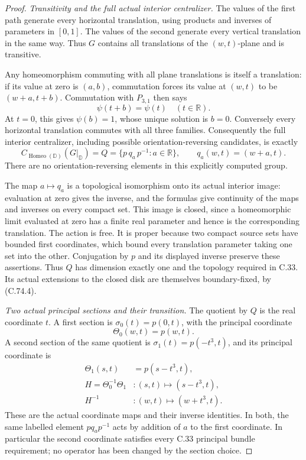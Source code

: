 \begin{proof}
\emph{Transitivity and the full actual interior centralizer.}
The values of the first path generate every
horizontal translation, using products and
inverses of parameters in $[0,1]$.
The values of the second generate every
vertical translation in the same way.
Thus $G$ contains all translations of the
$(w,t)$-plane and is transitive.

Any homeomorphism commuting with all plane
translations is itself a translation:
if its value at zero is $(a,b)$, commutation
forces its value at $(w,t)$ to be
$(w+a,t+b)$. Commutation with $P_{3,1}$
then says
\[
                         \psi(t+b)=\psi(t)
                                      \quad(t\in\mathbb R).
                                                               \tag{C.74.7}
\]
At $t=0$, this gives $\psi(b)=1$, whose unique
solution is $b=0$. Conversely every horizontal
translation commutes with all three families.
Consequently the full interior centralizer,
including possible orientation-reversing
candidates, is exactly
\[
 C_{\operatorname{Homeo}(\mathbb D)}(G|_{\mathbb D})
       =Q=\{p\,q_a\,p^{-1}:a\in\mathbb R\},
       \qquad q_a(w,t)=(w+a,t).                       \tag{C.74.8}
\]
There are no orientation-reversing elements
in this explicitly computed group.

The map $a\mapsto q_a$ is a topological
isomorphism onto its actual interior image:
evaluation at zero gives the inverse, and
the formulas give continuity of the maps
and inverses on every compact set.
This image is closed, since a homeomorphic
limit evaluated at zero has a finite real
parameter and hence is the corresponding
translation. The action is free. It is
proper because two compact source sets
have bounded first coordinates, which
bound every translation parameter taking
one set into the other.
Conjugation by $p$ and its displayed inverse
preserve these assertions. Thus $Q$ has
dimension exactly one and the topology
required in C.33. Its actual extensions to
the closed disk are themselves
boundary-fixed, by (C.74.4).

\emph{Two actual principal sections and their transition.}
The quotient by $Q$ is the real coordinate
$t$. A first section is $\sigma_0(t)=p(0,t)$,
with the principal coordinate
\[
               \Theta_0(w,t)=p(w,t).
\]
A second section of the same quotient is
$\sigma_1(t)=p(-t^3,t)$, and its principal
coordinate is
\[
 \begin{split}
 \Theta_1(s,t)&=p(s-t^3,t),\\
 H=\Theta_0^{-1}\Theta_1 &: (s,t)\longmapsto(s-t^3,t),\\
 H^{-1}&:(w,t)\longmapsto(w+t^3,t).
 \end{split}                                                   \tag{C.74.9}
\]
These are the actual coordinate maps and
their inverse identities. In both,
the same labelled element $p q_a p^{-1}$
acts by addition of $a$ to the first
coordinate. In particular the second
coordinate satisfies every C.33 principal
bundle requirement; no operator has
been changed by the section choice.


\end{proof}

